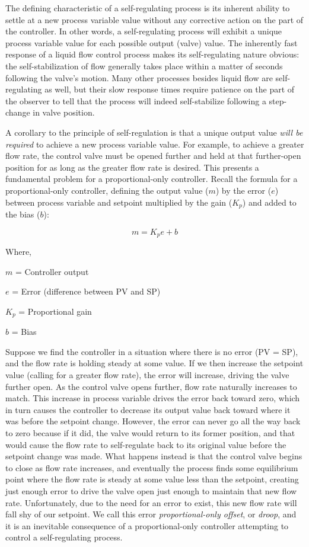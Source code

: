 The defining characteristic of a self-regulating process is its inherent ability to settle at a new process variable value without any corrective action on the part of the controller.  In other words, a self-regulating process will exhibit a unique process variable value for each possible output (valve) value.  The inherently fast response of a liquid flow control process makes its self-regulating nature obvious: the self-stabilization of flow generally takes place within a matter of seconds following the valve's motion.  Many other processes besides liquid flow are self-regulating as well, but their slow response times require patience on the part of the observer to tell that the process will indeed self-stabilize following a step-change in valve position.

A corollary to the principle of self-regulation is that a unique output value \textit{will be required} to achieve a new process variable value.  For example, to achieve a greater flow rate, the control valve must be opened further and held at that further-open position for as long as the greater flow rate is desired.  This presents a fundamental problem for a proportional-only controller.  Recall the formula for a proportional-only controller, defining the output value ($m$) by the error ($e$) between process variable and setpoint multiplied by the gain ($K_p$) and added to the bias ($b$):

$$m = K_p e + b$$

\noindent
Where,

$m$ = Controller output

$e$ = Error (difference between PV and SP)

$K_p$ = Proportional gain

$b$ = Bias

\vskip 10pt

Suppose we find the controller in a situation where there is no error (PV = SP), and the flow rate is holding steady at some value.  If we then increase the setpoint value (calling for a greater flow rate), the error will increase, driving the valve further open.  As the control valve opens further, flow rate naturally increases to match.  This increase in process variable drives the error back toward zero, which in turn causes the controller to decrease its output value back toward where it was before the setpoint change.  However, the error can never go all the way back to zero because if it did, the valve would return to its former position, and that would cause the flow rate to self-regulate back to its original value before the setpoint change was made.  What happens instead is that the control valve begins to close as flow rate increases, and eventually the process finds some equilibrium point where the flow rate is steady at some value less than the setpoint, creating just enough error to drive the valve open just enough to maintain that new flow rate.  Unfortunately, due to the need for an error to exist, this new flow rate will fall shy of our setpoint.  We call this error \textit{proportional-only offset}, or \textit{droop}, and it is an inevitable consequence of a proportional-only controller attempting to control a self-regulating process.  

